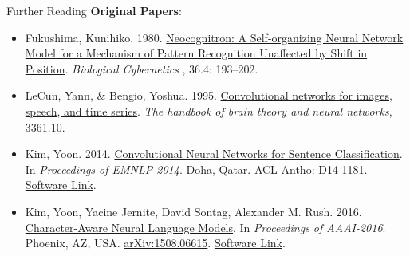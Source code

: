 \documentclass[xcolor=pdftex,x11names,table,hyperref]{beamer}
\newcommand{\Conv}{Convolutional}
\begin{document}
\begin{frame}{Further Reading}
\vspace{1.0em}
\textbf{Original Papers}:
\begin{tiny}
\begin{itemize}
	\item Fukushima, Kunihiko. 1980. \href{http://www.cs.princeton.edu/courses/archive/spr08/cos598B/Readings/Fukushima1980.pdf}{Neocognitron: A Self-organizing Neural Network Model for a Mechanism of Pattern Recognition Unaffected by Shift in Position}. \textit{Biological Cybernetics }, 36.4: 193--202.
	\item LeCun, Yann, \& Bengio, Yoshua. 1995. \href{http://www.iro.umontreal.ca/~lisa/pointeurs/handbook-convo.pdf}{\Conv{} networks for images, speech, and time series}. \textit{The handbook of brain theory and neural networks}, 3361.10.
	\item Kim, Yoon. 2014. \href{https://www.aclweb.org/anthology/D14-1181.pdf}{Convolutional Neural Networks for Sentence Classification}.  In \textit{Proceedings of EMNLP-2014}. Doha, Qatar. \href{https://www.aclweb.org/anthology/D14-1181.pdf}{ACL Antho: D14-1181}. \href{https://github.com/yoonkim/CNN_sentence}{Software Link}.
	\item Kim, Yoon, Yacine Jernite, David Sontag, Alexander M. Rush. 2016. \href{http://arxiv.org/abs/1508.06615}{Character-Aware Neural Language Models}.  In \textit{Proceedings of AAAI-2016}. Phoenix, AZ, USA. \href{http://arxiv.org/abs/1508.06615}{arXiv:1508.06615}. \href{https://github.com/yoonkim/lstm-char-cnn}{Software Link}.
\end{itemize}
\end{tiny}
\end{frame}





\end{document}
